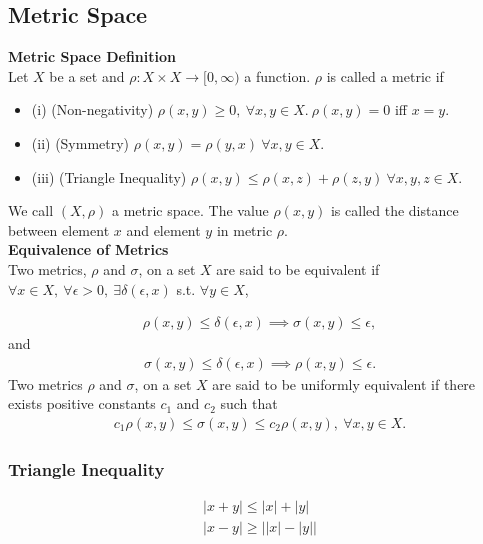 \documentclass{article}
\numberwithin{theorem}{subsection}
\numberwithin{theorem}{subsubsection}
\numberwithin{lemma}{subsection}
\numberwithin{lemma}{subsubsection}
\theoremstyle{definition}
\numberwithin{definition}{subsection}
\numberwithin{definition}{subsubsection}
\begin{document}
\subsection{Metric Space}

\noindent \textbf{Metric Space Definition} \\
\indent Let $X$ be a set and $\rho: X \times X \rightarrow [0,\infty)$ a function. $\rho$ is called a metric if
\begin{itemize}
    \item (i) (Non-negativity) $\rho(x,y) \geq 0,\ \forall x,y \in X.\ \rho(x,y) = 0$ iff $x = y$.
    \item (ii) (Symmetry) $\rho(x,y) = \rho(y,x)\ \forall x,y \in X$. 
    \item (iii) (Triangle Inequality) $\rho(x,y) \leq \rho(x,z) + \rho(z,y)\ \forall x,y,z \in X$.
\end{itemize}
We call $(X,\rho)$ a metric space. The value $\rho(x,y)$ is called the distance between element $x$ and element $y$ in metric $\rho$.
\\

\noindent \textbf{Equivalence of Metrics} \\
\indent Two metrics, $\rho$ and $\sigma$, on a set $X$ are said to be equivalent if $\forall x \in X,\ \forall \epsilon > 0,\ \exists \delta(\epsilon, x)$ s.t. $\forall y \in X$,

\begin{gather*}
    \rho(x,y) \leq \delta(\epsilon, x) \implies \sigma(x,y) \leq \epsilon,
\end{gather*}
\noindent and
\begin{gather*}
    \sigma(x,y) \leq \delta(\epsilon, x) \implies \rho(x,y) \leq \epsilon.
\end{gather*}
\indent Two metrics $\rho$ and $\sigma$, on a set $X$ are said to be uniformly equivalent if there exists positive constants $c_{1}$ and $c_{2}$ such that
\begin{gather*}
    c_{1}\rho(x,y) \leq \sigma(x,y) \leq c_{2}\rho(x,y),\ \forall x,y\in X.
\end{gather*}

\subsubsection{Triangle Inequality}
\begin{gather}
    \lvert x + y \rvert \leq \lvert x \rvert + \lvert y \rvert\\
    |x-y| \geq \big\lvert |x| - |y| \big\rvert
\end{gather}
\end{document}
